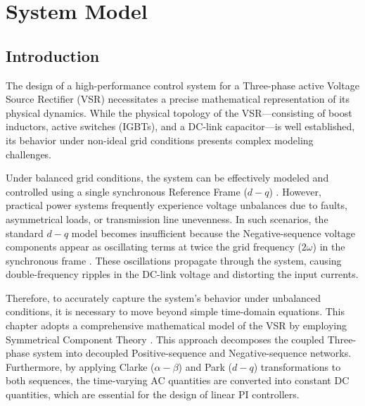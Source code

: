 \chapter{System Model}\label{ch:SystemModel}
\section{Introduction}
The design of a high-performance control system for a Three-phase active Voltage Source Rectifier (VSR) necessitates
a precise mathematical representation of its physical dynamics. While the physical topology of the VSR—consisting of
boost inductors, active switches (IGBTs), and a DC-link capacitor—is well established, its behavior under non-ideal
grid conditions presents complex modeling challenges.\par
Under balanced grid conditions, the system can be effectively modeled and controlled using a single synchronous Reference
Frame ($d-q$) \cite{lindgren1998modeling,wang2015pid, sanjuan2010voltage, electronics12112417}. However, practical power systems frequently experience voltage 
unbalances due to faults, asymmetrical loads, or transmission line unevenness. In such scenarios, the standard $d-q$ model
becomes insufficient because the Negative-sequence voltage components appear as oscillating terms at twice the grid frequency
($2\omega$) in the synchronous frame \cite{XinhuiWu}. These oscillations propagate through the system, causing double-frequency
ripples in the DC-link voltage and distorting the input currents.\par
Therefore, to accurately capture the system's behavior under unbalanced conditions, it is necessary to move beyond
simple time-domain equations. This chapter adopts a comprehensive mathematical model of the VSR by employing 
Symmetrical Component Theory \cite{Fortescue1918,lyon1954transient}. This approach decomposes the coupled Three-phase system into decoupled Positive-sequence
and Negative-sequence networks. Furthermore, by applying Clarke ($\alpha-\beta$) and Park ($d-q$) transformations
to both sequences, the time-varying AC quantities are converted into constant DC quantities, which are essential
for the design of linear PI controllers.\par
